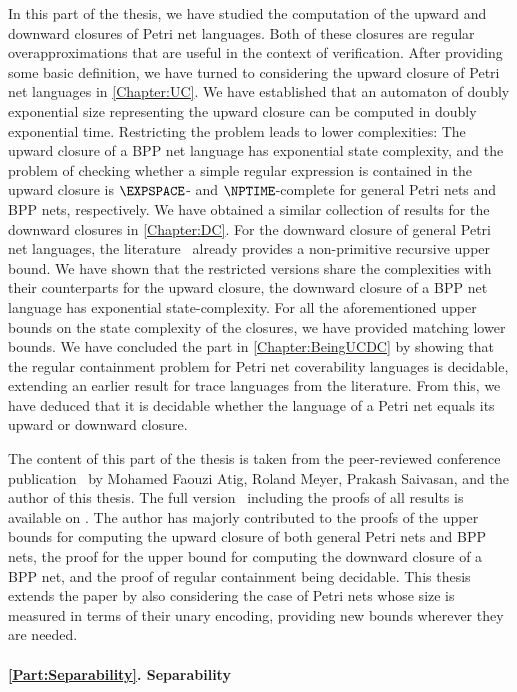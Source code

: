 \documentclass[../../diss.tex]{subfiles}
\begin{document}
In this part of the thesis, we have studied the computation of the upward and downward closures of Petri net languages.
Both of these closures are regular overapproximations that are useful in the context of verification.
After providing some basic definition, we have turned to considering the upward closure of Petri net languages in \cref{Chapter:UC}.
We have established that an automaton of doubly exponential size representing the upward closure can be computed in doubly exponential time.
Restricting the problem leads to lower complexities: The upward closure of a BPP net language has exponential state complexity, and the problem of checking whether a simple regular expression is contained in the upward closure is $\EXPSPACE$- and $\NPTIME$-complete for general Petri nets and BPP nets, respectively.
We have obtained a similar collection of results for the downward closures in \cref{Chapter:DC}.
For the downward closure of general Petri net languages, the literature~\cite{HabermehlMW10} already provides a non-primitive recursive upper bound.
We have shown that the restricted versions share the complexities with their counterparts for the upward closure, \eg the downward closure of a BPP net language has exponential state-complexity.
For all the aforementioned upper bounds on the state complexity of the closures, we have provided matching lower bounds.
We have concluded the part in \cref{Chapter:BeingUCDC} by showing that the regular containment problem for Petri net coverability languages is decidable, extending an earlier result for trace languages from the literature.
From this, we have deduced that it is decidable whether the language of a Petri net equals its upward or downward closure.

The content of this part of the thesis is taken from the peer-reviewed conference publication~\cite{AtigMMS17} by Mohamed Faouzi Atig, Roland Meyer, Prakash Saivasan, and the author of this thesis.
The full version~\cite{AtigMMS17a} including the proofs of all results is available on \arXiv.
The author has majorly contributed to the proofs of the upper bounds for computing the upward closure of both general Petri nets and BPP nets, the proof for the upper bound for computing the downward closure of a BPP net, and the proof of regular containment being decidable.
This thesis extends the paper by also considering the case of Petri nets whose size is measured in terms of their unary encoding, providing new bounds wherever they are needed.


\paragraph{\cref{Part:Separability}. Separability}
\end{document}
